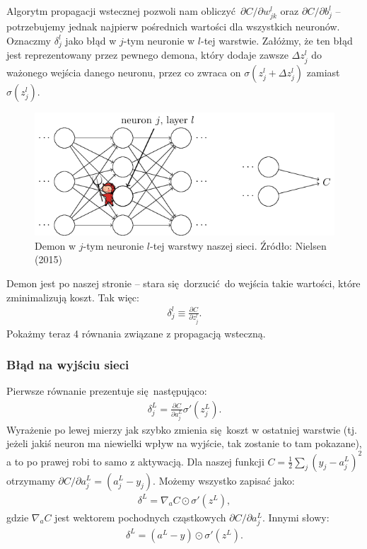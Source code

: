 \documentclass[10pt, oneside]{article}
\theoremstyle{remark}
\begin{document}
Algorytm propagacji wstecznej pozwoli nam obliczyć $\partial C / \partial w^l_{jk}$ oraz $\partial C / \partial b^l_{j}$ -- potrzebujemy jednak najpierw pośrednich wartości dla wszystkich neuronów.
Oznaczmy $\delta_j^l$ jako błąd w $j$-tym neuronie w $l$-tej warstwie.
Załóżmy, że ten błąd jest reprezentowany przez pewnego demona, który dodaje zawsze $\Delta z^l_j$ do ważonego wejścia danego neuronu, przez co zwraca on $\sigma(z^l_j+\Delta z^l_j)$ zamiast $\sigma(z^l_j)$.
\begin{figure}[!htpb]
	\centering
	\includegraphics[width=.5\linewidth]{figures/tikz19}
	\caption{Demon w $j$-tym neuronie $l$-tej warstwy naszej sieci. Źródło: Nielsen (2015)}
\end{figure}
Demon jest po naszej stronie -- stara się dorzucić do wejścia takie wartości, które zminimalizują koszt. 
Tak więc:
\begin{eqnarray} 
  \delta^l_j \equiv \frac{\partial C}{\partial z^l_j}.
\end{eqnarray}
Pokażmy teraz 4 równania związane z propagacją wsteczną.

\subsubsection{Błąd na wyjściu sieci}
Pierwsze równanie prezentuje się następująco:
\begin{eqnarray} 
  \delta^L_j = \frac{\partial C}{\partial a^L_j} \sigma'(z^L_j).
\end{eqnarray}
Wyrażenie po lewej mierzy jak szybko zmienia się koszt w ostatniej warstwie (tj. jeżeli jakiś neuron ma niewielki wpływ na wyjście, tak zostanie to tam pokazane), a to po prawej robi to samo z aktywacją.
Dla naszej funkcji $C = \frac{1}{2} \sum_j (y_j-a^L_j)^2$ otrzymamy $\partial C / \partial a^L_j = (a_j^L-y_j)$.
Możemy wszystko zapisać jako:
\begin{eqnarray} 
  \delta^L = \nabla_a C \odot \sigma'(z^L),
\end{eqnarray}
gdzie $\nabla_a C$ jest wektorem pochodnych cząstkowych ${\partial C}/{\partial a^L_j}$.
Innymi słowy:
\begin{eqnarray} 
  \delta^L = (a^L-y) \odot \sigma'(z^L).
\end{eqnarray}
\end{document}
